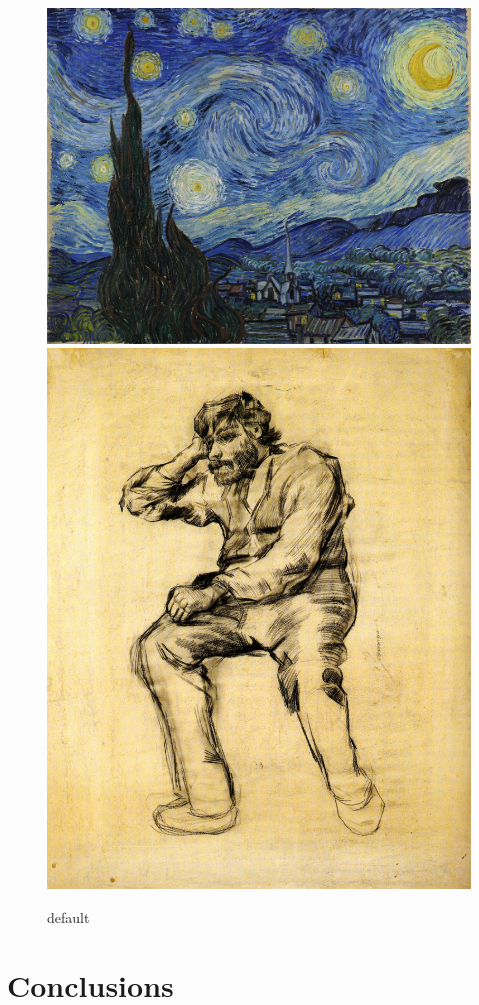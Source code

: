 \documentclass{article}
\begin{document}
\begin{figure}[htp]
	
	\centering
	\includegraphics[width=.5\textwidth]{image/1280px-Van_Gogh_-_Starry_Night_-_Google_Art_Project}\hfill
	\includegraphics[height=.5\textwidth]{image/vincent-van-gogh_seated-man-with-a-beard-1886-1}
	
	\caption{default}
	\label{fig:vangogh}
	
\end{figure}

\section{Conclusions}\label{conclusions}
\end{document}
